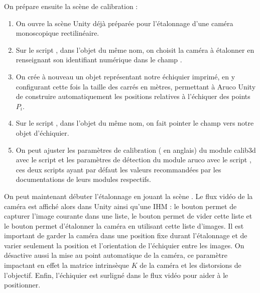
On prépare ensuite la scène de calibration :
\begin{enumerate}
  \item On ouvre la scène Unity  déjà préparée pour l'étalonnage d'une caméra monoscopique rectilinéaire.
  \item Sur le script , dans l'objet du même nom, on choisit la caméra à étalonner en renseignant son identifiant numérique dans le champ .
  \item On crée à nouveau un objet représentant notre échiquier imprimé, en y configurant cette fois la taille des carrés en mètres, permettant à Aruco Unity de construire automatiquement les positions relatives à l'échiquer des points $P_i$.
  \item Sur le script , dans l'objet du même nom, on fait pointer le champ  vers notre objet d'échiquier.
  \item On peut ajuster les paramètres de calibration ( en anglais) du module calib3d avec le script  et les paramètres de détection du module aruco avec le script , ces deux scripts ayant par défaut les valeurs recommandées par les documentations de leurs modules respectifs.
\end{enumerate}


On peut maintenant débuter l'étalonnage en jouant la scène . Le flux vidéo de la caméra est affiché alors dans Unity ainsi qu'une IHM : le bouton  permet de capturer l'image courante dans une liste, le bouton  permet de vider cette liste et le bouton  permet d'étalonner la caméra en utilisant cette liste d'images. Il est important de garder la caméra dans une position fixe durant l'étalonnage et de varier seulement la position et l'orientation de l'échiquier entre les images. On désactive aussi la mise au point automatique de la caméra, ce paramètre impactant en effet la matrice intrinsèque	$K$ de la caméra et les distorsions de l'objectif. Enfin, l'échiquier est surligné dans le flux vidéo pour aider à le positionner.

